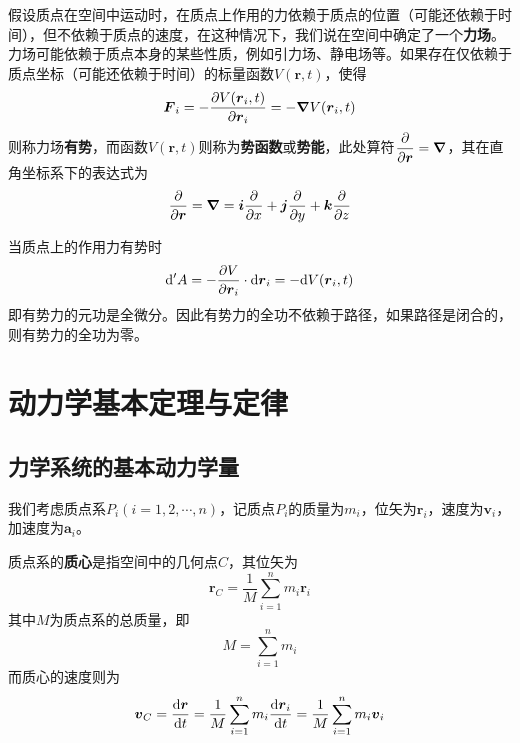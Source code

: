 假设质点在空间中运动时，在质点上作用的力依赖于质点的位置（可能还依赖于时间），但不依赖于质点的速度，在这种情况下，我们说在空间中确定了一个{\bf 力场}。力场可能依赖于质点本身的某些性质，例如引力场、静电场等。如果存在仅依赖于质点坐标（可能还依赖于时间）的标量函数$V(\boldsymbol{r},t)$，使得
\begin{equation}
	\boldsymbol{F}_i = -\frac{\partial V(\boldsymbol{r}_i,t)}{\partial \boldsymbol{r}_i} = -\boldsymbol{\nabla} V(\boldsymbol{r}_i, t)
\end{equation}
则称力场{\bf 有势}，而函数$V(\boldsymbol{r},t)$则称为{\bf 势函数}或{\bf 势能}，此处算符$\dfrac{\partial}{\partial \boldsymbol{r}} = \boldsymbol{\nabla}$，其在直角坐标系下的表达式为
\begin{equation}
	\dfrac{\partial}{\partial \boldsymbol{r}} = \boldsymbol{\nabla} = \boldsymbol{i}\frac{\partial}{\partial x} + \boldsymbol{j}\frac{\partial}{\partial y} + \boldsymbol{k}\frac{\partial}{\partial z}
\end{equation}

当质点上的作用力有势时
\begin{equation}
	\mathrm{d}'A = -\frac{\partial V}{\partial \boldsymbol{r}_i} \cdot \mathrm{d}\boldsymbol{r}_i = -\mathrm{d} V(\boldsymbol{r}_i,t)
	\label{chapter2:外力有势时的元功是全微分}
\end{equation}
即有势力的元功是全微分。因此有势力的全功不依赖于路径，如果路径是闭合的，则有势力的全功为零。


\section{动力学基本定理与定律}

\subsection{力学系统的基本动力学量}

我们考虑质点系$P_i(i=1,2,\cdots,n)$，记质点$P_i$的质量为$m_i$，位矢为$\boldsymbol{r}_i$，速度为$\boldsymbol{v}_i$，加速度为$\boldsymbol{a}_i$。

质点系的{\bf 质心}是指空间中的几何点$C$，其位矢为
\begin{equation}
	\boldsymbol{r}_C = \frac{1}{M}\sum_{i=1}^nm_i\boldsymbol{r}_i
\end{equation}
其中$M$为质点系的总质量，即
\begin{equation}
	M = \sum_{i=1}^nm_i
\end{equation}
而质心的速度则为
\begin{equation}
	\boldsymbol{v}_C = \frac{\mathrm{d}\boldsymbol{r}}{\mathrm{d} t} = \frac{1}{M}\sum_{i=1}^nm_i\frac{\mathrm{d}\boldsymbol{r}_i}{\mathrm{d} t} = \frac{1}{M}\sum_{i=1}^nm_i\boldsymbol{v}_i
	\label{chapter2:质心的速度}
\end{equation}

